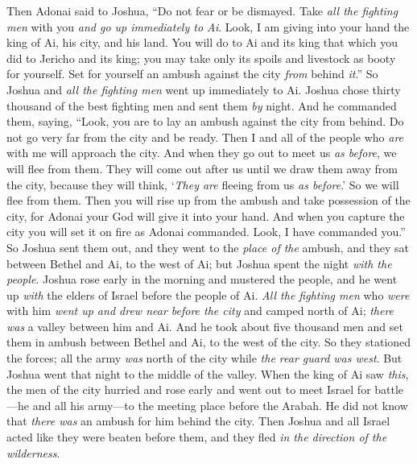 \begin{biblechapter} %
 Then Adonai said to Joshua, “Do not fear or be dismayed. Take \textit{all the fighting men} with you \textit{and go up immediately to Ai}. Look, I am giving into your hand the king of Ai, his city, and his land.
\verse You will do to Ai and its king that which you did to Jericho and its king; you may take only its spoils and livestock as booty for yourself. Set for yourself an ambush against the city \textit{from} behind \textit{it}.”
\verse So Joshua and \textit{all the fighting men} went up immediately to Ai. Joshua chose thirty thousand of the best fighting men and sent them \textit{by} night.
\verse And he commanded them, saying, “Look, you are to lay an ambush against the city from behind. Do not go very far from the city and be ready.
\verse Then I and all of the people who \textit{are} with me will approach the city. And when they go out to meet us \textit{as before}, we will flee from them.
\verse They will come out after us until we draw them away from the city, because they will think, ‘\textit{They are} fleeing from us \textit{as before}.’ So we will flee from them.
\verse Then you will rise up from the ambush and take possession of the city, for Adonai your God will give it into your hand.
\verse And when you capture the city you will set it on fire as Adonai commanded. Look, I have commanded you.”
\verse So Joshua sent them out, and they went to the \textit{place of the} ambush, and they sat between Bethel and Ai, to the west of Ai; but Joshua spent the night \textit{with the people}.
\verse Joshua rose early in the morning and mustered the people, and he went up \textit{with} the elders of Israel before the people of Ai.
\verse \textit{All the fighting men} who \textit{were} with him \textit{went up and drew near before the city} and camped north of Ai; \textit{there was} a valley between him and Ai.
\verse And he took about five thousand men and set them in ambush between Bethel and Ai, to the west of the city.
\verse So they stationed the forces; all the army \textit{was} north of the city while \textit{the rear guard was west}. But Joshua went that night to the middle of the valley.
\verse When the king of Ai saw \textit{this}, the men of the city hurried and rose early and went out to meet Israel for battle—he and all his army—to the meeting place before the Arabah. He did not know that \textit{there was} an ambush for him behind the city.
\verse Then Joshua and all Israel acted like they were beaten before them, and they fled \textit{in the direction of the wilderness}.

\end{biblechapter}

